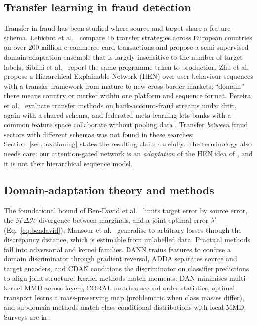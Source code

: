 \documentclass[journal]{IEEEtran}
\newcommand{\1}{\mathbf{1}}
\newcommand{\Hspace}{\mathcal{H}}
\begin{document}
\subsection{Transfer learning in fraud detection}\label{sec:rwtransfer}
Transfer in fraud has been studied where source and target share a feature schema. Lebichot et al.\ \cite{lebichot2021transfer} compare $15$ transfer strategies across European countries on over $200$ million e-commerce card transactions and propose a semi-supervised domain-adaptation ensemble that is largely insensitive to the number of target labels; Siblini et al.\ \cite{siblini2021transfer} report the same programme taken to production. Zhu et al.\ \cite{zhu2020hen} propose a Hierarchical Explainable Network (HEN) over user behaviour sequences with a transfer framework from mature to new cross-border markets; ``domain'' there means country or market within one platform and sequence format. Pereira et al.\ \cite{pereira2025evaluating} evaluate transfer methods on bank-account-fraud streams under drift, again with a shared schema, and federated meta-learning lets banks with a common feature space collaborate without pooling data \cite{zheng2020federated}. Transfer \emph{between} fraud sectors with different schemas was not found in these searches; Section~\ref{sec:positioning} states the resulting claim carefully. The terminology also needs care: our attention-gated network is an \emph{adaptation} of the HEN idea of \cite{zhu2020hen}, and it is not their hierarchical sequence model.

\subsection{Domain-adaptation theory and methods}
The foundational bound of Ben-David et al.\ \cite{bendavid2010theory} limits target error by source error, the $\Hspace\Delta\Hspace$-divergence between marginals, and a joint-optimal error $\lambda^\star$ (Eq.~\eqref{eq:bendavid}); Mansour et al.\ \cite{mansour2009domain} generalise to arbitrary losses through the discrepancy distance, which is estimable from unlabelled data. Practical methods fall into adversarial and kernel families. DANN \cite{ganin2016dann} trains features to confuse a domain discriminator through gradient reversal, ADDA \cite{tzeng2017adda} separates source and target encoders, and CDAN \cite{long2018cdan} conditions the discriminator on classifier predictions to align joint structure. Kernel methods match moments: DAN \cite{long2015dan} minimises multi-kernel MMD \cite{gretton2012kernel} across layers, CORAL \cite{sun2016coral} matches second-order statistics, optimal transport \cite{courty2017ot} learns a mass-preserving map (problematic when class masses differ), and subdomain methods \cite{zhu2021dsan} match class-conditional distributions with local MMD. Surveys are in \cite{panyang2010survey}.
\end{document}
